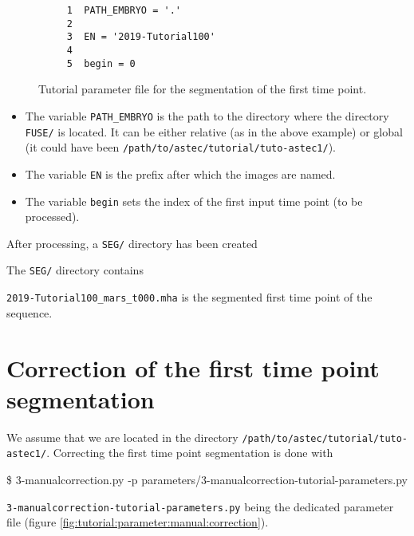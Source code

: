\begin{figure}
\begin{framed}
\begin{verbatim}
     1	PATH_EMBRYO = '.'
     2	
     3	EN = '2019-Tutorial100'
     4	
     5	begin = 0
\end{verbatim}
\end{framed}
\caption{\label{fig:tutorial:parameter:mars} Tutorial
  parameter file for the segmentation of the first time point.}
\end{figure}


\begin{itemize}
  \itemsep -0.5ex
  \item The variable \texttt{PATH\_EMBRYO} is the path to the directory where
    the directory \texttt{FUSE/} is located. It can be either relative (as in the
    above example) or
    global (it could have been \texttt{/path/to/astec/tutorial/tuto-astec1/}).
  \item The variable \texttt{EN} is the prefix after which the  images
    are named. 
  \item The variable \texttt{begin} sets  the
    index of the first input time point (to be processed).
\end{itemize}

After processing, a \texttt{SEG/} directory has been created

\mbox{}
\mbox{}

The \texttt{SEG/} directory contains

\mbox{}
\mbox{}

\texttt{2019-Tutorial100\_mars\_t000.mha} is the segmented first
  time point of the sequence.



\section{Correction of  the first time point segmentation}
\label{sec:tutorial:manual:correction}


We assume that we are located in the directory
\texttt{/path/to/astec/tutorial/tuto-astec1/}. Correcting the first
time point segmentation is
done with
\begin{code}{0.8}
  \$ 3-manualcorrection.py -p parameters/3-manualcorrection-tutorial-parameters.py 
\end{code}
\texttt{3-manualcorrection-tutorial-parameters.py} being the
dedicated parameter file  (figure \ref{fig:tutorial:parameter:manual:correction}).

